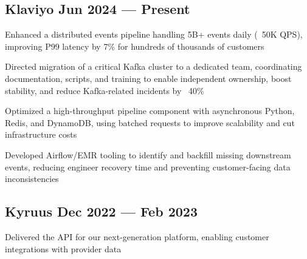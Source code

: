 
\subsection{{Klaviyo \hfill Jun 2024 --- Present}}
\begin{zitemize}
\item Enhanced a distributed events pipeline handling 5B+ events daily (~50K QPS), improving P99 latency by 7\% for hundreds of thousands of customers
\item Directed migration of a critical Kafka cluster to a dedicated team, coordinating documentation, scripts, and training to enable independent ownership, boost stability, and reduce Kafka-related incidents by ~40\%
\item Optimized a high-throughput pipeline component with asynchronous Python, Redis, and DynamoDB, using batched requests to improve scalability and cut infrastructure costs
\item Developed Airflow/EMR tooling to identify and backfill missing downstream events, reducing engineer recovery time and preventing customer-facing data inconsistencies
\end{zitemize}


\subsection{{Kyruus \hfill Dec 2022 --- Feb 2023}}
\begin{zitemize}
\item Delivered the API for our next-generation platform, enabling customer integrations with provider data
\end{zitemize}

